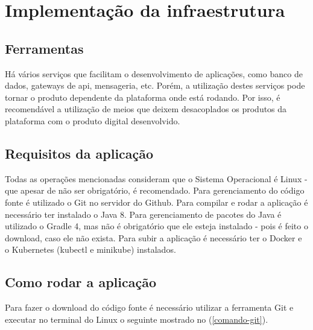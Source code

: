 \chapter{Implementação da infraestrutura}\label{implementação-da-infraestrutura}

\section{Ferramentas}\label{ferramentas}


Há vários serviços que facilitam o desenvolvimento de aplicações, como banco de dados,
gateways de api, mensageria, etc. Porém, a utilização destes serviços pode
tornar o produto dependente da plataforma onde está rodando. Por isso, é recomendável
a utilização de meios que deixem desacoplados os produtos da plataforma com o produto
digital desenvolvido.





\section{Requisitos da aplicação}\label{requisitos-da-aplicacao}

Todas as operações mencionadas consideram que o Sistema Operacional é Linux
- que apesar de não ser obrigatório, é recomendado.
Para gerenciamento do código fonte é utilizado o Git no servidor do Github.
Para compilar e rodar a aplicação é necessário ter instalado o Java 8.
Para gerenciamento de pacotes do Java é utilizado o Gradle 4, mas não
é obrigatório que ele esteja instalado - pois é feito o download, caso
ele não exista. Para subir a aplicação é necessário ter o Docker e o
Kubernetes (kubectl e minikube) instalados.


\section{Como rodar a aplicação}\label{como-rodar-a-aplicacao}

Para fazer o download do código fonte é necessário utilizar a ferramenta Git
e executar no terminal do Linux o seguinte mostrado no (\autoref{comando-git}).


